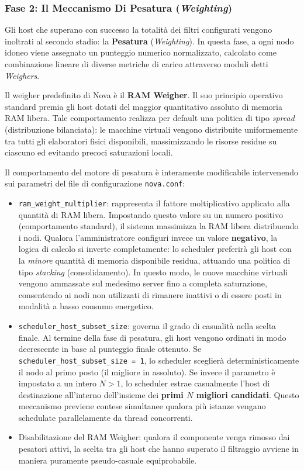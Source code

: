 \documentclass[11pt, a4paper]{article}
\begin{document}
\subsubsection{Fase 2: Il Meccanismo Di Pesatura (\emph{Weighting})}

Gli host che superano con successo la totalità dei filtri configurati vengono inoltrati al secondo stadio: la \textbf{Pesatura} (\emph{Weighting}). In questa fase, a ogni nodo idoneo viene assegnato un punteggio numerico normalizzato, calcolato come combinazione lineare di diverse metriche di carico attraverso moduli detti \emph{Weighers}.

Il weigher predefinito di Nova è il \textbf{RAM Weigher}. Il suo principio operativo standard premia gli host dotati del maggior quantitativo assoluto di memoria RAM libera. Tale comportamento realizza per default una politica di tipo \emph{spread} (distribuzione bilanciata): le macchine virtuali vengono distribuite uniformemente tra tutti gli elaboratori fisici disponibili, massimizzando le risorse residue su ciascuno ed evitando precoci saturazioni locali.

Il comportamento del motore di pesatura è interamente modificabile intervenendo sui parametri del file di configurazione \texttt{nova.conf}:
\begin{itemize}[leftmargin=*]
    \item \texttt{ram\_weight\_multiplier}: rappresenta il fattore moltiplicativo applicato alla quantità di RAM libera. Impostando questo valore su un numero positivo (comportamento standard), il sistema massimizza la RAM libera distribuendo i nodi. Qualora l'amministratore configuri invece un valore \textbf{negativo}, la logica di calcolo si inverte completamente: lo scheduler preferirà gli host con la \emph{minore} quantità di memoria disponibile residua, attuando una politica di tipo \emph{stacking} (consolidamento). In questo modo, le nuove macchine virtuali vengono ammassate sul medesimo server fino a completa saturazione, consentendo ai nodi non utilizzati di rimanere inattivi o di essere posti in modalità a basso consumo energetico.
    \item \texttt{scheduler\_host\_subset\_size}: governa il grado di casualità nella scelta finale. Al termine della fase di pesatura, gli host vengono ordinati in modo decrescente in base al punteggio finale ottenuto. Se \texttt{scheduler\_host\_subset\_size = 1}, lo scheduler sceglierà deterministicamente il nodo al primo posto (il migliore in assoluto). Se invece il parametro è impostato a un intero $N > 1$, lo scheduler estrae casualmente l'host di destinazione all'interno dell'insieme dei \textbf{primi $N$ migliori candidati}. Questo meccanismo previene contese simultanee qualora più istanze vengano schedulate parallelamente da thread concorrenti.
    \item Disabilitazione del RAM Weigher: qualora il componente venga rimosso dai pesatori attivi, la scelta tra gli host che hanno superato il filtraggio avviene in maniera puramente pseudo-casuale equiprobabile.
\end{itemize}
\end{document}
